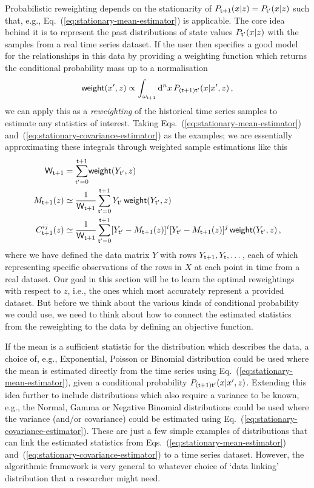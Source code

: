 Probabilistic reweighting depends on the stationarity of $P_{{\sf t}+1}(x\vert z)=P_{{\sf t}'}(x\vert z)$ such that, e.g., Eq.~(\ref{eq:stationary-mean-estimator}) is applicable. The core idea behind it is to represent the past distributions of state values $P_{{\sf t}'}(x\vert z)$ with the samples from a real time series dataset. If the user then specifies a good model for the relationships in this data by providing a weighting function which returns the conditional probability mass up to a normalisation
\begin{align}
{\sf weight}(x',z) \propto \int_{\omega_{{\sf t}+1}} {\rm d}^nx\, P_{({\sf t}+1){\sf t}'}(x\vert x',z) \,,  
\end{align}
we can apply this as a \emph{reweighting} of the historical time series samples to estimate any statistics of interest. Taking Eqs.~(\ref{eq:stationary-mean-estimator}) and~(\ref{eq:stationary-covariance-estimator}) as the examples; we are essentially approximating these integrals through weighted sample estimations like this
\begin{align}
{\sf W}_{{\sf t}+1} &= {\sum^{{\sf t}+1}_{{\sf t}'=0}} {\sf weight}(Y_{{\sf t}'},z) \\
M_{{\sf t}+1}(z) &\simeq \frac{1}{{\sf W}_{{\sf t}+1}}\sum^{{\sf t}+1}_{{\sf t}'=0}Y_{{\sf t}'} \, {\sf weight}(Y_{{\sf t}'},z) \\
C^{ij}_{{\sf t}+1}(z) &\simeq \frac{1}{{\sf W}_{{\sf t}+1}}\sum^{{\sf t}+1}_{{\sf t}'=0}[Y_{{\sf t}'}-M_{{\sf t}+1}(z)]^i[Y_{{\sf t}'}-M_{{\sf t}+1}(z)]^j \, {\sf weight}(Y_{{\sf t}'},z) \,,
\end{align}
where we have defined the data matrix $Y$ with rows $Y_{{\sf t}+1}, Y_{{\sf t}}, \dots$, each of which representing specific observations of the rows in $X$ at each point in time from a real dataset. Our goal in this section will be to learn the optimal reweightings with respect to $z$, i.e., the ones which most accurately represent a provided dataset. But before we think about the various kinds of conditional probability we could use, we need to think about how to connect the estimated statistics from the reweighting to the data by defining an objective function. 

If the mean is a sufficient statistic for the distribution which describes the data, a choice of, e.g., Exponential, Poisson or Binomial distribution could be used where the mean is estimated directly from the time series using Eq.~(\ref{eq:stationary-mean-estimator}), given a conditional probability $P_{({\sf t}+1){\sf t}'}(x\vert x',z)$. Extending this idea further to include distributions which also require a variance to be known, e.g., the Normal, Gamma or Negative Binomial distributions could be used where the variance (and/or covariance) could be estimated using Eq.~(\ref{eq:stationary-covariance-estimator}). These are just a few simple examples of distributions that can link the estimated statistics from Eqs.~(\ref{eq:stationary-mean-estimator}) and~(\ref{eq:stationary-covariance-estimator}) to a time series dataset. However, the algorithmic framework is very general to whatever choice of `data linking' distribution that a researcher might need.

